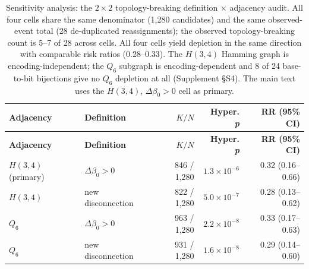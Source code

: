 \documentclass[preprint,11pt,authoryear,a4paper]{elsarticle}
\begin{document}
\begin{longtable}[]{@{}llrrr@{}}
\caption{Sensitivity analysis: the \(2 \times 2\) topology-breaking
definition \(\times\) adjacency audit. All four cells share the same
denominator (1,280 candidates) and the same observed-event total (28
de-duplicated reassignments); the observed topology-breaking count is
5--7 of 28 across cells. All four cells yield depletion in the same
direction with comparable risk ratios (0.28--0.33). The \(H(3,4)\)
Hamming graph is encoding-independent; the \(Q_{6}\) subgraph is
encoding-dependent and 8 of 24 base-to-bit bijections give no \(Q_{6}\)
depletion at all (Supplement §S4). The main text uses the \(H(3,4)\),
\(\Delta\beta_{0} > 0\) cell as primary.}\tabularnewline
\toprule\noalign{}
\textbf{Adjacency} & \textbf{Definition} & \textbf{\(K/N\)} &
\textbf{Hyper. \emph{p}} & \textbf{RR (95\% CI)} \\
\midrule\noalign{}
\endfirsthead
\toprule\noalign{}
\textbf{Adjacency} & \textbf{Definition} & \textbf{\(K/N\)} &
\textbf{Hyper. \emph{p}} & \textbf{RR (95\% CI)} \\
\midrule\noalign{}
\endhead
\bottomrule\noalign{}
\endlastfoot
\(H(3,4)\) (primary) & \(\Delta\beta_{0} > 0\) & 846 / 1,280 &
\(1.3 \times 10^{- 6}\) & 0.32 (0.16--0.66) \\
\(H(3,4)\) & new disconnection & 822 / 1,280 & \(5.0 \times 10^{- 7}\) &
0.28 (0.13--0.62) \\
\(Q_{6}\) & \(\Delta\beta_{0} > 0\) & 963 / 1,280 &
\(2.2 \times 10^{- 8}\) & 0.33 (0.17--0.63) \\
\(Q_{6}\) & new disconnection & 931 / 1,280 & \(1.6 \times 10^{- 8}\) &
0.29 (0.14--0.60) \\
\end{longtable}

\protect{}\label{tbl:topo-audit}{}
\end{document}
